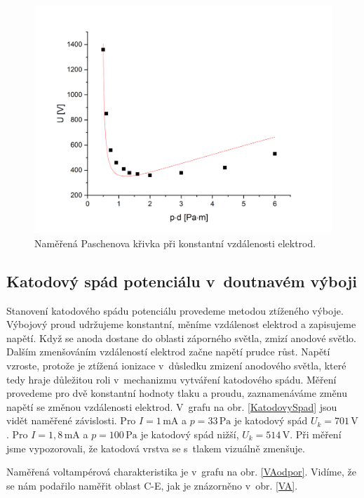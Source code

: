 \documentclass[a4paper,12pt]{article}
\begin{document}
\begin{figure}[h]
	\centering
	\includegraphics[width=130mm]{dfixed.png}
	\caption{Naměřená Paschenova křivka při konstantní vzdálenosti elektrod.}
	\label{dfixed}
\end{figure}

\newpage
\subsection{Katodový spád potenciálu v~doutnavém výboji}
Stanovení katodového spádu potenciálu provedeme metodou ztíženého výboje. Výbojový proud udržujeme konstantní, měníme vzdálenost elektrod a zapisujeme napětí. Když se anoda dostane do oblasti záporného světla, zmizí anodové světlo. Dalším zmenšováním vzdáleností elektrod začne napětí prudce růst. Napětí vzroste, protože je ztížená ionizace v~důsledku zmizení anodového světla, které tedy hraje důležitou roli v~mechanizmu vytváření katodového spádu. Měření provedeme pro dvě konstantní hodnoty tlaku a proudu, zaznamenáváme změnu napětí se změnou vzdálenosti elektrod. V~grafu na obr. \ref{KatodovySpad} jsou vidět naměřené závislosti. Pro $I = 1\,\si{\milli\ampere}$ a $p = 33\,\si{\pascal}$ je katodový spád $U_k = 701\,\si{\volt}$. Pro $I = 1,8\,\si{\milli\ampere}$ a $p = 100\,\si{\pascal}$ je katodový spád nižší,  $U_k = 514\,\si{\volt}$. Při měření jsme vypozorovali, že katodová vrstva se s~tlakem vizuálně zmenšuje.


Naměřená voltampérová charakteristika je v~grafu na obr. \ref{VAodpor}. Vidíme, že se nám podařilo naměřit oblast C-E, jak je znázorněno v~obr. \ref{VA}.
\end{document}
